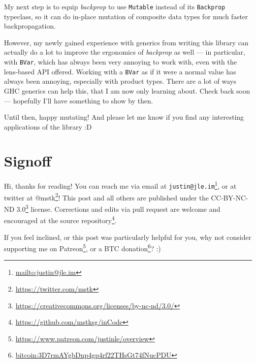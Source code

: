 \documentclass[]{article}
\renewcommand{\href}[2]{#2\footnote{\url{#1}}}
\begin{document}
My next step is to equip \emph{backprop} to use \texttt{Mutable} instead of its
\texttt{Backprop} typeclass, so it can do in-place mutation of composite data
types for much faster backpropagation.

However, my newly gained experience with generics from writing this library can
actually do a lot to improve the ergonomics of \emph{backprop} as well --- in
particular, with \texttt{BVar}, which has always been very annoying to work
with, even with the lens-based API offered. Working with a \texttt{BVar} as if
it were a normal value has always been annoying, especially with product types.
There are a lot of ways GHC generics can help this, that I am now only learning
about. Check back soon --- hopefully I'll have something to show by then.

Until then, happy mutating! And please let me know if you find any interesting
applications of the library :D

\section{Signoff}\label{signoff}

Hi, thanks for reading! You can reach me via email at
\href{mailto:justin@jle.im}{\nolinkurl{justin@jle.im}}, or at twitter at
\href{https://twitter.com/mstk}{@mstk}! This post and all others are published
under the \href{https://creativecommons.org/licenses/by-nc-nd/3.0/}{CC-BY-NC-ND
3.0} license. Corrections and edits via pull request are welcome and encouraged
at \href{https://github.com/mstksg/inCode}{the source repository}.

If you feel inclined, or this post was particularly helpful for you, why not
consider \href{https://www.patreon.com/justinle/overview}{supporting me on
Patreon}, or a \href{bitcoin:3D7rmAYgbDnp4gp4rf22THsGt74fNucPDU}{BTC donation}?
:)
\end{document}
